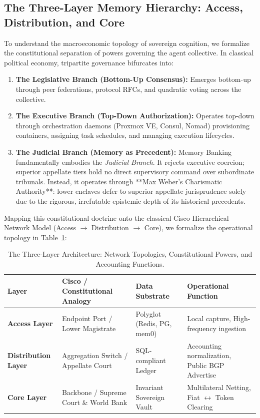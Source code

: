 \documentclass[11pt,a4paper]{article}
\begin{document}
\subsection{The Three-Layer Memory Hierarchy: Access, Distribution, and Core}
\label{sub:three_layers}

To understand the macroeconomic topology of sovereign cognition, we formalize the constitutional separation of powers governing the agent collective. In classical political economy, tripartite governance bifurcates into:
\begin{enumerate}
    \item \textbf{The Legislative Branch (Bottom-Up Consensus):} Emerges bottom-up through peer federations, protocol RFCs, and quadratic voting across the collective.
    \item \textbf{The Executive Branch (Top-Down Authorization):} Operates top-down through orchestration daemons (Proxmox VE, Consul, Nomad) provisioning containers, assigning task schedules, and managing execution lifecycles.
    \item \textbf{The Judicial Branch (Memory as Precedent):} Memory Banking fundamentally embodies the \textit{Judicial Branch}. It rejects executive coercion; superior appellate tiers hold no direct supervisory command over subordinate tribunals. Instead, it operates through **Max Weber's Charismatic Authority**: lower enclaves defer to superior appellate jurisprudence solely due to the rigorous, irrefutable epistemic depth of its historical precedents.
\end{enumerate}

Mapping this constitutional doctrine onto the classical Cisco Hierarchical Network Model (Access $\to$ Distribution $\to$ Core), we formalize the operational topology in Table~\ref{tab:three_layers}:

\begin{table}[ht]
\centering
\caption{The Three-Layer Architecture: Network Topologies, Constitutional Powers, and Accounting Functions.}
\label{tab:three_layers}
\small
\begin{tabular}{@{}llll@{}}
\toprule
\textbf{Layer} & \textbf{Cisco / Constitutional Analogy} & \textbf{Data Substrate} & \textbf{Operational Function} \\
\midrule
\textbf{Access Layer}       & Endpoint Port / Lower Magistrate        & Polyglot (Redis, PG, mem0) & Local capture, High-frequency ingestion \\
\textbf{Distribution Layer} & Aggregation Switch / Appellate Court    & SQL-compliant Ledger       & Accounting normalization, Public BGP Advertise \\
\textbf{Core Layer}         & Backbone / Supreme Court \& World Bank  & Invariant Sovereign Vault  & Multilateral Netting, Fiat $\leftrightarrow$ Token Clearing \\
\bottomrule
\end{tabular}
\end{table}
\end{document}
